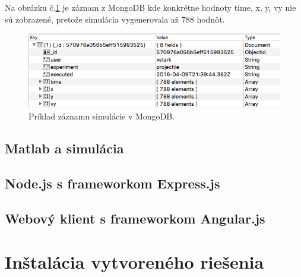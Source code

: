 Na obrázku č.\ref{img-mongo-record} je záznam z MongoDB kde konkrétne hodnoty time, x, y, vy nie sú zobrazené, pretože simulácia vygenerovala až 788 hodnôt.

\begin{figure}[H]
  \centering
  \includegraphics[scale=0.7]{img/code/mongodb-record.png}
  \caption{Príklad záznamu simulácie v MongoDB.}
  \label{img-mongo-record}
\end{figure}


\subsection{Matlab a simulácia}

\subsection{Node.js s frameworkom Express.js}

\subsection{Webový klient s frameworkom Angular.js}


\section{Inštalácia vytvoreného riešenia}